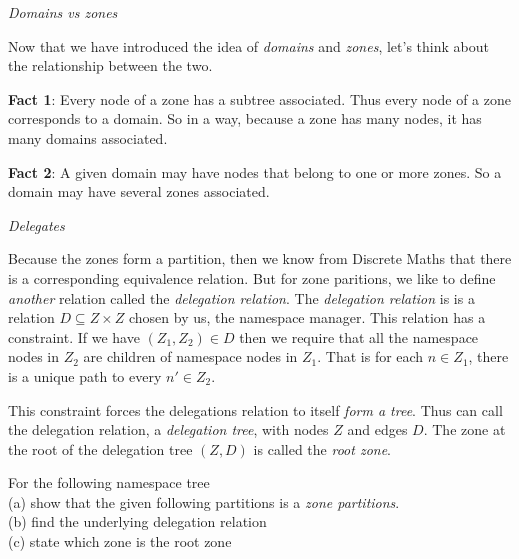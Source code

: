 \frmrule 

\begin{example}
\end{example}

\frmrule

\textit{Domains vs zones}

Now that we have introduced the idea of \textit{domains} and \textit{zones}, 
let's think about the relationship between the two.

\textbf{Fact 1}: Every node of a zone has a subtree associated. 
Thus every node of a zone corresponds to a domain. 
So in a way, because a zone has many nodes, 
it has many domains associated. 

\textbf{Fact 2}: A given domain may have nodes that belong to one 
or more zones. So a domain may have several zones associated.


\frmrule

\textit{Delegates}

Because the zones form a partition, then we know from Discrete Maths that 
there is a corresponding equivalence relation. 
But for zone paritions, we like to define \textit{another} relation 
called the \textit{delegation relation}.
The \textit{delegation relation} is is a 
relation $D \subseteq Z \times Z$ chosen by 
us, the namespace manager.  
This relation has a constraint. If 
we have $(Z_1,Z_2) \in D$ then we require that
all the namespace nodes in $Z_2$ are children of namespace nodes in $Z_1$. 
That is for each $n \in Z_1$, there is a unique path to every $n' \in Z_2$. 


This constraint forces the delegations relation to itself \textit{form a tree}. 
Thus can call the delegation relation, a \textit{delegation tree}, with nodes $Z$ and 
edges $D$. The zone at the root of the delegation tree $(Z,D)$ is called the \textit{root zone}.  


\frmrule 


\begin{example}
For the following namespace tree\\
(a) show that the given following partitions is a \textit{zone partitions}. \\
(b) find the underlying delegation relation\\
(c) state which zone is the root zone\\
\end{example}


